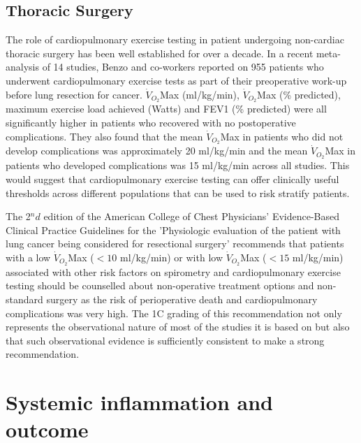 \subsection{Thoracic Surgery}
The role of cardiopulmonary exercise testing in patient undergoing non-cardiac thoracic surgery has been well established for over a decade. In a recent meta-analysis of 14 studies, Benzo and co-workers reported on 955 patients who underwent cardiopulmonary exercise tests as part of their preoperative work-up before lung resection for cancer. $\dot{V}_{O_2}$Max (ml/kg/min), $\dot{V}_{O_2}$Max (\% predicted), maximum exercise load achieved (Watts) and FEV1 (\% predicted) were all significantly higher in patients who recovered with no postoperative complications. They also found that the mean $\dot{V}_{O_2}$Max in patients who did not develop complications was approximately 20 ml/kg/min and the mean $\dot{V}_{O_2}$Max in patients who developed complications was 15 ml/kg/min across all studies. This would suggest that cardiopulmonary exercise testing can offer clinically useful thresholds across different populations that can be used to risk stratify patients.\parencite{benzo_complications_2007}

The 2$^nd$ edition of the American College of Chest Physicians' Evidence-Based Clinical Practice Guidelines for the 'Physiologic evaluation of the patient with lung cancer being considered for resectional surgery' recommends that patients with a low $\dot{V}_{O_2}$Max ($<10$ ml/kg/min) or with low $\dot{V}_{O_2}$Max ($<15$ ml/kg/min) associated with other risk factors on spirometry and cardiopulmonary exercise testing should be counselled about non-operative treatment options and non-standard surgery as the risk of perioperative death and cardiopulmonary complications was very high. The 1C grading of this recommendation not only represents the observational nature of most of the studies it is based on but also that such observational evidence is sufficiently consistent\parencite{benzo_complications_2007} to make a strong recommendation.\parencite{colice_physiologic_2007}

\clearpage

\section{Systemic inflammation and outcome}
\label{sec:intro_systemic_inflammation_outcome}


